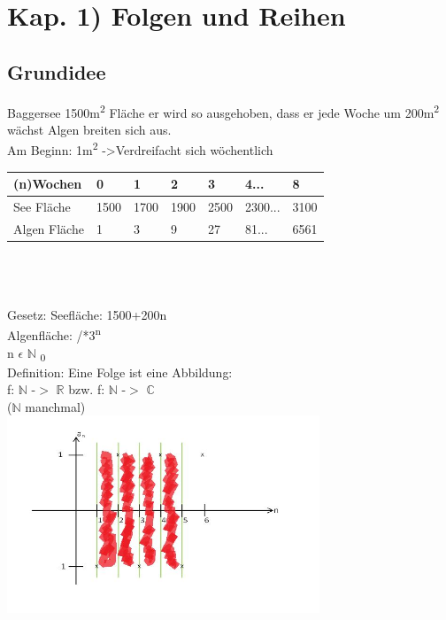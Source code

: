 \documentclass[11pt,a4paper]{article}
\author{Barbara Wiedermann}
\begin{document}
	\section{Kap. 1) Folgen und Reihen}
	\subsection{Grundidee}
	 	Baggersee 1500m\textsuperscript{2} Fläche er wird so ausgehoben, dass er jede Woche um 200m\textsuperscript{2} wächst Algen breiten sich aus.\\
	 	Am Beginn: 1m\textsuperscript{2} -\textgreater Verdreifacht sich wöchentlich\\
	 	
\begin{tabular}{|l|l|l|l|l|l|l|}
\hline
(n)Wochen    & 0    & 1    & 2    & 3    & 4...    & 8    \\ \hline
See Fläche   & 1500 & 1700 & 1900 & 2500 & 2300... & 3100 \\ \hline
Algen Fläche & 1    & 3    & 9    & 27   & 81...   & 6561 \\ \hline
\end{tabular}\\\\\\
Gesetz: Seefläche: 1500+200n\\
Algenfläche: /*3\textsuperscript{n}\\
n $\epsilon$ $\mathbb{N}$ \textsubscript{0} \\

Definition: Eine Folge ist eine Abbildung: \\
f: $\mathbb{N}$ -$>$ $\mathbb{R}$ bzw. f: $\mathbb{N}$ -$>$ $\mathbb{C}$\\
($\mathbb{N}$ manchmal)\\

\includegraphics[width = 0.7\textwidth]{img/Zeichnung.jpg}
\end{document}

